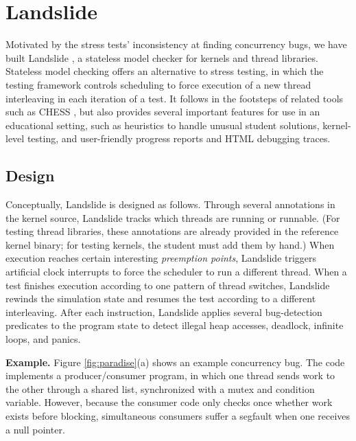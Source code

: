 \section{Landslide}
\label{sec:landslide}

Motivated by the stress tests' inconsistency at finding concurrency bugs,
we have built Landslide%
, a stateless model checker for \pebbles kernels and thread libraries.
Stateless model checking \cite{verisoft} offers an alternative
to stress testing,
in which the testing framework controls scheduling to force execution of a new thread interleaving in each iteration of a test.
It follows in the footsteps of related tools such as CHESS \cite{chess},
but also provides several important features for use in an educational setting,
such as heuristics to handle unusual student solutions, kernel-level testing, and user-friendly progress reports and HTML debugging traces.

\subsection{Design}

Conceptually,
Landslide is designed as follows.
Through several annotations in the kernel source, Landslide tracks
which threads are running or runnable.
(For testing thread libraries, these annotations are already provided in the reference kernel binary;
for testing kernels, the student must add them by hand.)
When execution reaches certain interesting {\em preemption points},
Landslide triggers artificial clock interrupts
to force the scheduler to run a different thread.
When a test finishes execution according
to one pattern of thread switches,
Landslide rewinds the simulation state
and resumes the test according to a different interleaving.
After each instruction,
Landslide applies several bug-detection predicates to
the program state to detect
illegal heap accesses,
deadlock, infinite loops, and panics.

{\bf Example.}
Figure \ref{fig:paradise}(a) shows an example concurrency bug. %
The code implements a producer/consumer program, in which one thread sends work to the other through a shared list,
synchronized with a mutex and condition variable.
However, because the consumer code only checks once whether work exists before blocking,
simultaneous consumers suffer
a segfault when one receives a null  pointer. %


